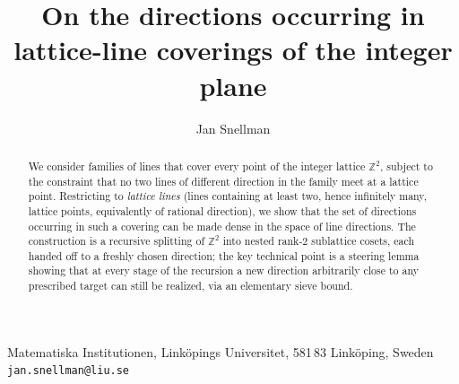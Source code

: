 \documentclass[a4paper,11pt,oneside,reqno]{amsart}
\theoremstyle{definition}
\theoremstyle{remark}
\theoremstyle{plain}
\newcommand{\Z}{\mathbb{Z}}
\begin{document}
\title[Lattice-line directions]{On the directions occurring in lattice-line coverings of the integer plane}
\author{Jan Snellman }
\address{Matematiska Institutionen, Linköpings Universitet, 581 83 Linköping, Sweden}
\makeatletter
\let\addresses\@empty
\makeatother
\maketitle

\begin{center}
  \small
  Matematiska Institutionen, Linköpings Universitet, 581\,83 Linköping, Sweden\\
  \texttt{jan.snellman@liu.se}
\end{center}

\begin{abstract}
  We consider families of lines that cover every point of the integer lattice \(\Z^2\), subject to
  the constraint that no two lines of different direction in the family meet at a lattice point.
  Restricting to \emph{lattice lines} (lines containing at least two, hence infinitely many,
  lattice points, equivalently of rational direction), we show that the set of directions
  occurring in such a covering can be made dense in the space of line directions. The construction
  is a recursive splitting of \(\Z^2\) into nested rank-2 sublattice cosets, each handed off to a
  freshly chosen direction; the key technical point is a steering lemma showing that at every
  stage of the recursion a new direction arbitrarily close to any prescribed target can still be
  realized, via an elementary sieve bound.
\end{abstract}
\end{document}
